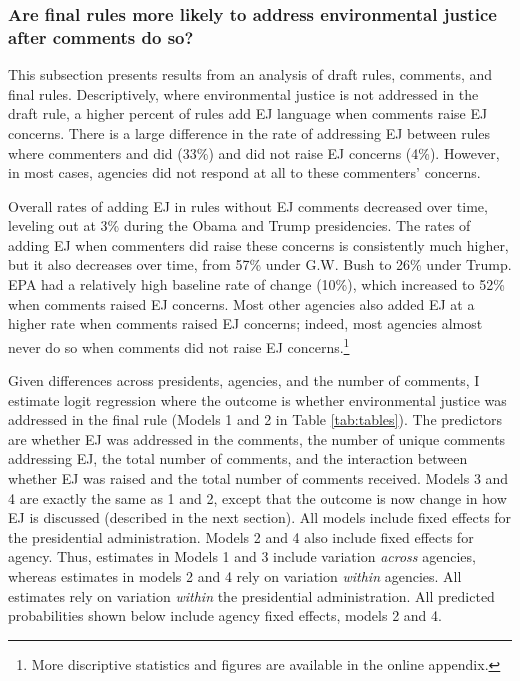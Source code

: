 \documentclass[
      12pt,
        ]{article}
\begin{document}
\hypertarget{are-final-rules-more-likely-to-address-environmental-justice-after-comments-do-so}{%
\subsubsection{Are final rules more likely to address environmental justice after comments do so?}\label{are-final-rules-more-likely-to-address-environmental-justice-after-comments-do-so}}

This subsection presents results from an analysis of draft
rules, comments, and final rules. Descriptively,
where environmental
justice is not addressed in the draft rule, a higher percent of rules add EJ language when comments raise EJ concerns. There is a large difference in the rate of addressing EJ between rules where commenters and did (33\%) and did not raise EJ concerns (4\%). However, in most cases, agencies did not respond at all to these commenters' concerns.

Overall rates of adding EJ in rules without EJ comments decreased over time, leveling out at 3\% during the Obama and Trump presidencies. The rates of adding EJ when commenters did raise these concerns is consistently much higher, but it also decreases over time, from 57\% under G.W. Bush to 26\% under Trump.
EPA had a relatively high baseline rate of change (10\%), which increased to 52\% when comments raised EJ concerns. Most other agencies also added EJ at a higher rate when comments raised EJ concerns; indeed, most agencies almost never do so when comments did not raise EJ concerns.\footnote{More discriptive statistics and figures are available in the online appendix.}

Given differences across presidents, agencies, and the number of comments, I estimate logit regression where the outcome is whether environmental justice was addressed in the final rule (Models 1 and 2 in Table \ref{tab:tables}). The predictors are
whether EJ was addressed in the comments, the number of unique comments addressing EJ, the total number of comments, and the interaction between whether EJ was raised and the total number of comments received. Models 3 and 4 are exactly the same as 1 and 2, except that the outcome is now change in how EJ is discussed (described in the next section). All models include fixed effects for the presidential administration. Models 2 and 4 also include fixed effects for agency. Thus, estimates in Models 1 and 3 include variation \emph{across} agencies, whereas estimates in models 2 and 4 rely on variation \emph{within} agencies. All estimates rely on variation \emph{within} the presidential administration.
All predicted probabilities shown below include agency fixed effects, models 2 and 4.
\end{document}
